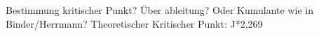 \documentclass{scrreprt}
\begin{document}
	Bestimmung kritischer Punkt? Über ableitung? Oder Kumulante wie in Binder/Herrmann?
	Theoretischer Kritischer Punkt: J*2,269
%		
%	
%	
%	
%		
%	
%	
%		
%	
%	
%	
%		
%		
	\listoffigures
	
	
	
	\printbibliography[heading=bibintoc]
\end{document}
